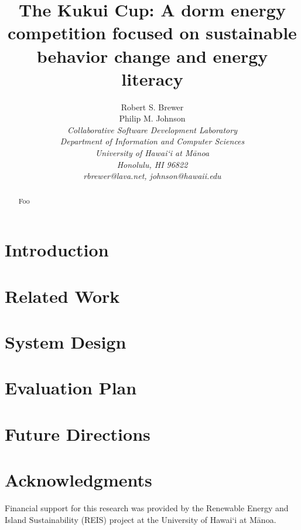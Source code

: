 \documentclass[conference,peerreview]{IEEEtran}
\begin{document}
\title{The Kukui Cup: A dorm energy competition focused on sustainable behavior change and energy literacy}

\author{Robert S. Brewer\\
        Philip M. Johnson\\
\em     Collaborative Software Development Laboratory\\
        Department of Information and Computer Sciences\\
        University of Hawai`i at M\=anoa\\
        Honolulu, HI 96822\\
        rbrewer@lava.net, johnson@hawaii.edu\\
}


\IEEEpeerreviewmaketitle

\begin{abstract}  %
 Foo
\end{abstract}


\section{Introduction}
\label{sec:intro}

\cite{GooglePowerMeter}

\section{Related Work}

\section{System Design}

\section{Evaluation Plan}

\section{Future Directions}


\section{Acknowledgments}

Financial support for this research was provided by the Renewable Energy and
Island Sustainability (REIS) project at the University of Hawai`i at M\=anoa.




\end{document}
